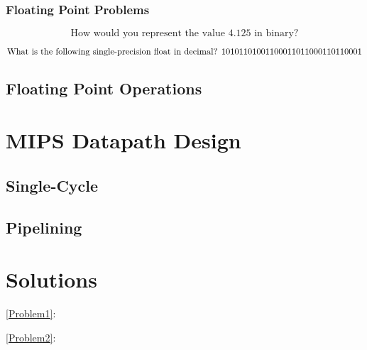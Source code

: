 \documentclass{article}
\begin{document}
\subsubsection{Floating Point Problems}\label{Floating Point Problems}

\begin{equation}\label{Problem1}
    \text{How would you represent the value } 4.125 \text{ in binary?}
\end{equation}

\begin{equation}\label{Problem2}
    \text{What is the following single-precision float in decimal? } \\ 
    1 01011010 01100011011000110110001
\end{equation}

\subsection{Floating Point Operations}\label{Floating Point Operations}

\section{MIPS Datapath Design}

\subsection{Single-Cycle}

\subsection{Pipelining}

\section{Solutions}

\ref{Problem1}: 

\ref{Problem2}:

\printindex
\end{document}
